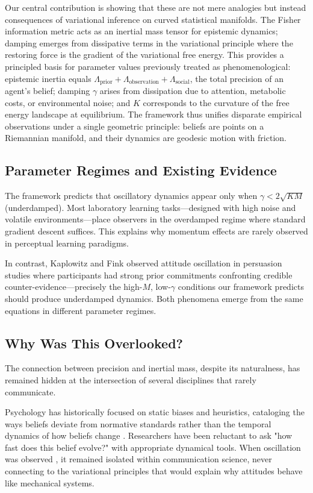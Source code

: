 \documentclass[12pt]{article}
\begin{document}
Our central contribution is showing that these are not mere analogies but instead consequences of variational inference on curved statistical manifolds. The Fisher information metric acts as an inertial mass tensor for epistemic dynamics; damping emerges from dissipative terms in the variational principle where the restoring force is the gradient of the variational free energy. This provides a principled basis for parameter values previously treated as phenomenological: epistemic inertia equals $\Lambda_{\text{prior}} + \Lambda_{\text{observation}} + \Lambda_{\text{social}}$, the total precision of an agent's belief; damping $\gamma$ arises from dissipation due to attention, metabolic costs, or environmental noise; and $K$ corresponds to the curvature of the free energy landscape at equilibrium. The framework thus unifies disparate empirical observations under a single geometric principle: beliefs are points on a Riemannian manifold, and their dynamics are geodesic motion with friction.

\subsection{Parameter Regimes and Existing Evidence}

The framework predicts that oscillatory dynamics appear only when 
$\gamma < 2\sqrt{KM}$ (underdamped). Most laboratory learning tasks—designed 
with high noise and volatile environments—place observers in the overdamped 
regime where standard gradient descent suffices. This explains why momentum 
effects are rarely observed in perceptual learning paradigms.

In contrast, Kaplowitz and Fink \citep{kaplowitz1992} observed attitude 
oscillation in persuasion studies where participants had strong prior 
commitments confronting credible counter-evidence—precisely the high-$M$, 
low-$\gamma$ conditions our framework predicts should produce underdamped 
dynamics. Both phenomena emerge from the same equations in different 
parameter regimes.


\subsection{Why Was This Overlooked?}

The connection between precision and inertial mass, despite its naturalness, has remained hidden at the intersection of several disciplines that rarely communicate. 

Psychology has historically focused on static biases and heuristics, cataloging the ways beliefs deviate from normative standards rather than the temporal dynamics of how beliefs change \citep{nickerson1998}. Researchers have been reluctant to ask "how fast does this belief evolve?" with appropriate dynamical tools. When oscillation was observed \citep{kaplowitz1983, fink2002}, it remained isolated within communication science, never connecting to the variational principles that would explain why attitudes behave like mechanical systems.
\end{document}
